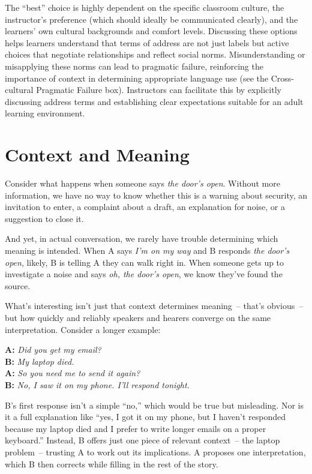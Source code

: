 The ``best'' choice is highly dependent on the specific classroom culture, the instructor's preference (which should ideally be communicated clearly), and the learners' own cultural backgrounds and comfort levels. Discussing these options helps learners understand that terms of address are not just labels but active choices that negotiate relationships and reflect social norms. Misunderstanding or misapplying these norms can lead to pragmatic failure, reinforcing the importance of context in determining appropriate language use (see the Cross-cultural Pragmatic Failure box). Instructors can facilitate this by explicitly discussing address terms and establishing clear expectations suitable for an adult learning environment.

\section{Context and Meaning}

Consider what happens when someone says \textit{the door's open}. Without more information, we have no way to know whether this is a warning about security, an invitation to enter, a complaint about a draft, an explanation for noise, or a suggestion to close it.

And yet, in actual conversation, we rarely have trouble determining which meaning is intended. When A says \textit{I'm on my way} and B responds \textit{the door's open}, likely, B is telling A they can walk right in. When someone gets up to investigate a noise and says \textit{oh, the door's open}, we know they've found the source. 

What's interesting isn't just that context determines meaning~-- that's obvious~-- but how quickly and reliably speakers and hearers converge on the same interpretation. Consider a longer example:

\ea
   \textbf{A:} \textit{Did you get my email?}\\
   \textbf{B:} \textit{My laptop died.}\\
   \textbf{A:} \textit{So you need me to send it again?}\\
   \textbf{B:} \textit{No, I saw it on my phone. I'll respond tonight.}
\z

B's first response isn't a simple ``no,'' which would be true but misleading. Nor is it a full explanation like ``yes, I got it on my phone, but I haven't responded because my laptop died and I prefer to write longer emails on a proper keyboard.'' Instead, B offers just one piece of relevant context~-- the laptop problem~-- trusting A to work out its implications. A proposes one interpretation, which B then corrects while filling in the rest of the story.

